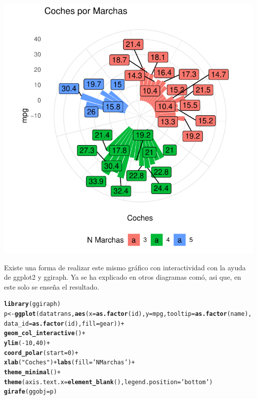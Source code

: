 \documentclass{article}\usepackage[]{graphicx}\usepackage[]{color}
\makeatletter
\def\maxwidth{ %
  \ifdim\Gin@nat@width>\linewidth
    \linewidth
  \else
    \Gin@nat@width
  \fi
}
\newcommand{\hlnum}[1]{\textcolor[rgb]{0.686,0.059,0.569}{#1}}%
\newcommand{\hlstr}[1]{\textcolor[rgb]{0.192,0.494,0.8}{#1}}%
\newcommand{\hlopt}[1]{\textcolor[rgb]{0,0,0}{#1}}%
\newcommand{\hlstd}[1]{\textcolor[rgb]{0.345,0.345,0.345}{#1}}%
\newcommand{\hlkwb}[1]{\textcolor[rgb]{0.69,0.353,0.396}{#1}}%
\newcommand{\hlkwc}[1]{\textcolor[rgb]{0.333,0.667,0.333}{#1}}%
\newcommand{\hlkwd}[1]{\textcolor[rgb]{0.737,0.353,0.396}{\textbf{#1}}}%
\newenvironment{kframe}{%
 \def\at@end@of@kframe{}%
 \ifinner\ifhmode%
  \def\at@end@of@kframe{\end{minipage}}%
  \begin{minipage}{\columnwidth}%
 \fi\fi%
 \def\FrameCommand##1{\hskip\@totalleftmargin \hskip-\fboxsep
 \colorbox{shadecolor}{##1}\hskip-\fboxsep
     \hskip-\linewidth \hskip-\@totalleftmargin \hskip\columnwidth}%
 \MakeFramed {\advance\hsize-\width
   \@totalleftmargin\z@ \linewidth\hsize
   \@setminipage}}%
 {\par\unskip\endMakeFramed%
 \at@end@of@kframe}
\newenvironment{knitrout}{}{} %
\makeatother
\begin{document}
\begin{knitrout}
\color{fgcolor}

{\centering \includegraphics[width=\maxwidth]{figure/plot_ggplot_final_cr-1} 

}



\end{knitrout}
\clearpage
Existe una forma de realizar este mismo gr\'afico con interactividad con la ayuda de ggplot2 y ggiraph. Ya se ha explicado en otros diagramas com\'o, asi que, en este solo se ense\~na el resultado.
\begin{knitrout}
\color{fgcolor}\begin{kframe}
\begin{alltt}
\hlkwd{library}\hlstd{(ggiraph)}
\hlstd{p} \hlkwb{<-} \hlkwd{ggplot}\hlstd{(datatrans,} \hlkwd{aes}\hlstd{(}\hlkwc{x}\hlstd{=}\hlkwd{as.factor}\hlstd{(id),} \hlkwc{y}\hlstd{=mpg,} \hlkwc{tooltip}\hlstd{=}\hlkwd{as.factor}\hlstd{(name),}
                      \hlkwc{data_id} \hlstd{=} \hlkwd{as.factor}\hlstd{(id),} \hlkwc{fill} \hlstd{= gear))} \hlopt{+}
  \hlkwd{geom_col_interactive}\hlstd{()} \hlopt{+}
  \hlkwd{ylim}\hlstd{(}\hlopt{-}\hlnum{10}\hlstd{,}\hlnum{40}\hlstd{)} \hlopt{+}
  \hlkwd{coord_polar}\hlstd{(}\hlkwc{start} \hlstd{=} \hlnum{0}\hlstd{)} \hlopt{+}
  \hlkwd{xlab}\hlstd{(}\hlstr{"Coches"}\hlstd{)} \hlopt{+} \hlkwd{labs}\hlstd{(}\hlkwc{fill}\hlstd{=}\hlstr{'N Marchas'}\hlstd{)} \hlopt{+}
  \hlkwd{theme_minimal}\hlstd{()} \hlopt{+}
  \hlkwd{theme}\hlstd{(}\hlkwc{axis.text.x} \hlstd{=} \hlkwd{element_blank}\hlstd{(),} \hlkwc{legend.position} \hlstd{=} \hlstr{'bottom'}\hlstd{)}
\hlkwd{girafe}\hlstd{(}\hlkwc{ggobj} \hlstd{= p)}
\end{alltt}
\end{kframe}
\end{knitrout}
\end{document}
